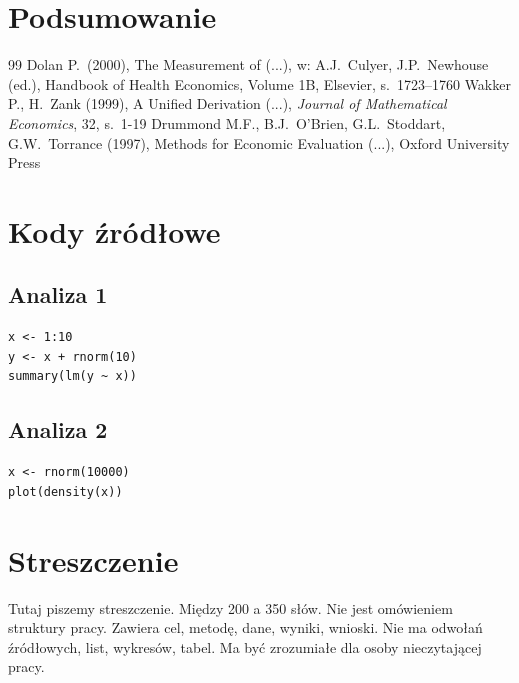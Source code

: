 \documentclass[12pt,a4paper,twoside,openany]{book}
\begin{document}
\clearpage

\chapter{Podsumowanie}



\clearpage
{}
\begin{thebibliography}{99}
\setlength{\itemsep}{0pt}%
 Dolan P.~(2000), The Measurement of (...), w: A.J.~Culyer, J.P.~Newhouse (ed.), Handbook of Health Economics, Volume 1B, Elsevier, s.~1723--1760
 Wakker P., H.~Zank (1999), A Unified Derivation (...), \textit{Journal of  Mathematical Economics}, 32, s.~1-19
 Drummond M.F., B.J.~O'Brien, G.L.~Stoddart, G.W.~Torrance (1997), Methods for Economic Evaluation (...), Oxford University Press
\end{thebibliography}

\clearpage
{}
\listoffigures

\clearpage
\listoftables
{}

\appendix
\chapter*{Kody źródłowe}

\section*{Analiza 1}
\begin{verbatim}
x <- 1:10
y <- x + rnorm(10)
summary(lm(y ~ x))
\end{verbatim}

\section*{Analiza 2}
\begin{verbatim}
x <- rnorm(10000)
plot(density(x))
\end{verbatim}

\clearpage

\chapter*{Streszczenie}

Tutaj piszemy streszczenie. Między 200 a 350 słów. Nie jest omówieniem struktury pracy. Zawiera cel, metodę, dane, wyniki, wnioski. Nie ma odwołań źródłowych, list, wykresów, tabel. Ma być zrozumiałe dla osoby nieczytającej pracy.
\end{document}
